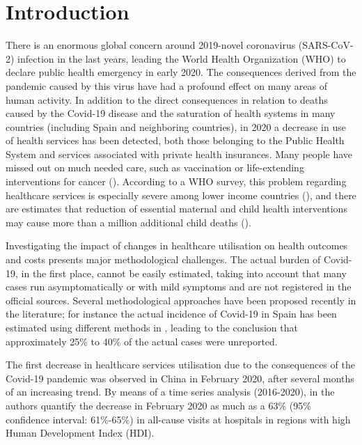 \documentclass[main.tex]{subfiles}
\begin{document}
\section{Introduction}\label{sec:intro}
There is an enormous global concern around 2019-novel coronavirus (SARS-CoV-2)
infection in the last years, leading the World Health Organization (WHO) to declare
public health emergency in early 2020. The consequences derived from the pandemic
caused by this virus have had a profound effect on many areas of human activity. In
addition to the direct consequences in relation to deaths caused by the Covid-19 disease
and the saturation of health systems in many countries (including Spain and neighboring
countries), in 2020 a decrease in use of health services has been detected, both those
belonging to the Public Health System and services associated with private health
insurances. Many people have missed out on much needed care, such as vaccination or life-extending interventions for cancer (\cite{baum_admissions_2020, mcdonald_early_2020, maringe_impact_2020}). According to a WHO survey, this problem regarding healthcare services is especially severe among lower income countries (\cite{noauthor_pulse_nodate}), and there are estimates that reduction of essential maternal and child health interventions may cause more than a million additional child deaths (\cite{roberton_early_2020}). 

Investigating the impact of changes in healthcare utilisation on health outcomes and costs presents major methodological challenges. The actual burden of Covid-19, in the first place, cannot be easily estimated, taking into account that many cases run asymptomatically or with mild symptoms and are not registered in the official sources. Several methodological approaches have been proposed recently in the literature; for instance the actual incidence of Covid-19 in Spain has been estimated using different methods in \cite{fernandez-fontelo_estimating_2020, morina_cumulated_2021}, leading to the conclusion that approximately 25\% to 40\% of the actual cases were unreported.

The first decrease in healthcare services utilisation due to the consequences of the Covid-19 pandemic was observed in China in February 2020, after several months of an increasing trend. By means of a time series analysis (2016-2020), in \cite{xiao_impact_2021} the authors quantify the decrease in February 2020 as much as a 63\% (95\% confidence interval: 61\%-65\%) in all-cause visits at hospitals in regions with high Human Development Index (HDI).
\end{document}
